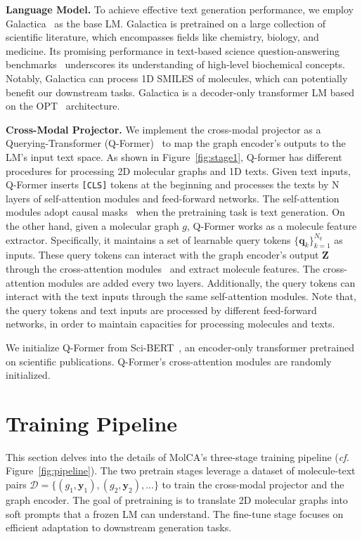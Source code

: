 \documentclass[11pt]{article}
\newcommand{\cf}{\emph{cf. }}
\newcommand{\Mat}[1]{\textbf{#1}}
\newcommand{\Set}[1]{\mathcal{#1}}
\newcommand{\Vtr}[1]{\boldsymbol{#1}}
\begin{document}
\textbf{Language Model.} To achieve effective text generation performance, we employ Galactica~\citep{Galactica} as the base LM. Galactica is pretrained on a large collection of scientific literature, which encompasses fields like chemistry, biology, and medicine. Its promising performance in text-based science question-answering benchmarks~\citep{MMLU, PubMedQA} underscores its understanding of high-level biochemical concepts. Notably, Galactica can process 1D SMILES of molecules, which can potentially benefit our downstream tasks. Galactica is a decoder-only transformer LM based on the OPT~\citep{OPT} architecture. 





\textbf{Cross-Modal Projector.} 
We implement the cross-modal projector as a Querying-Transformer (Q-Former)~\citep{BLIP2} to map the graph encoder's outputs to the LM's input text space. 
As shown in Figure~\ref{fig:stage1}, Q-former has different procedures for processing 2D molecular graphs and 1D texts. Given text inputs, Q-Former inserts \texttt{[CLS]} tokens at the beginning and processes the texts by N layers of self-attention modules and feed-forward networks. The self-attention modules adopt causal masks~\citep{T5} when the pretraining task is text generation. On the other hand, given a molecular graph $g$, Q-Former works as a molecule feature extractor. Specifically, it maintains a set of learnable query tokens $\{\Vtr{q}_k\}_{k=1}^{N_q}$ as inputs. These query tokens can interact with the graph encoder's output $\Mat{Z}$ through the cross-attention modules~\citep{Transformer} and extract molecule features. The cross-attention modules are added every two layers. Additionally, the query tokens can interact with the text inputs through the same self-attention modules. Note that, the query tokens and text inputs are processed by different feed-forward networks, in order to maintain capacities for processing molecules and texts.


We initialize Q-Former from Sci-BERT~\citep{SciBERT}, an encoder-only transformer pretrained on scientific publications. 
Q-Former's cross-attention modules are randomly initialized.

\section{Training Pipeline}
This section delves into the details of MolCA's three-stage training pipeline (\cf Figure~\ref{fig:pipeline}). The two pretrain stages leverage a dataset of molecule-text pairs $\Set{D}=\{(g_1, \Vtr{y}_1), (g_2, \Vtr{y}_2), ...\}$ to train the cross-modal projector and the graph encoder. The goal of pretraining is to translate 2D molecular graphs into soft prompts that a frozen LM can understand. The fine-tune stage focuses on efficient adaptation to downstream generation tasks.
\end{document}
